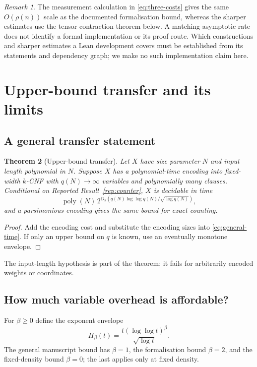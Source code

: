 \documentclass[11pt,reqno]{amsart}
\numberwithin{equation}{section}
\theoremstyle{plain}
\newtheorem{theorem}{Theorem}[section]
\theoremstyle{definition}
\theoremstyle{remark}
\newtheorem{remark}[theorem]{Remark}
\newcommand{\poly}{\operatorname{poly}}
\begin{document}
\begin{remark}
The measurement calculation in \eqref{eq:three-costs} gives the same
$O(\rho(n))$ scale as the documented formalisation bound, whereas the
sharper estimates use the tensor contraction theorem below. A matching
asymptotic rate does not identify a formal implementation or its proof
route. Which constructions and sharper estimates a Lean development
covers must be established from its statements and dependency graph;
we make no such implementation claim here.
\end{remark}

\section{Upper-bound transfer and its limits}\label{sec:upper}

\subsection{A general transfer statement}
\begin{theorem}[Upper-bound transfer]\label{thm:transfer}
Let $X$ have size parameter $N$ and input length polynomial in $N$. Suppose
$X$ has a polynomial-time encoding into fixed-width $k$-CNF with $q(N)\to\infty$
variables and polynomially many clauses. Conditional on Reported
Result~\ref{rep:counter}, $X$ is decidable in time
\begin{equation}\label{eq:transfer}
 \poly(N)\,2^{O_k(q(N)\log\log q(N)/\sqrt{\log q(N)})},
\end{equation}
and a parsimonious encoding gives the same bound for exact counting.
\end{theorem}
\begin{proof}
Add the encoding cost and substitute the encoding sizes into
\eqref{eq:general-time}. If only an upper bound on $q$ is known, use an
eventually monotone envelope.
\end{proof}
The input-length hypothesis is part of the theorem; it fails for arbitrarily
encoded weights or coordinates.

\subsection{How much variable overhead is affordable?}
For $\beta\ge0$ define the exponent envelope
\[
 H_\beta(t)=\frac{t(\log\log t)^\beta}{\sqrt{\log t}}.
\]
The general manuscript bound has $\beta=1$, the formalisation bound
$\beta=2$, and the fixed-density bound $\beta=0$; the last applies only at
fixed density.
\end{document}
